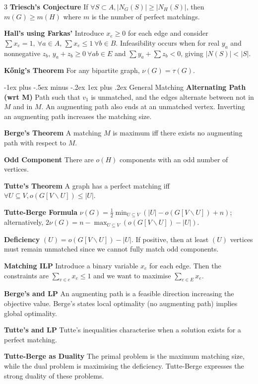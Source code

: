 \documentclass[10pt, landscape]{article}
\makeatletter
\renewcommand{\subsection}{\@startsection{subsection}{3}{0mm}%
                                {-1ex plus -.5ex minus -.2ex}%
                                {1ex plus .2ex}%
                                {\normalfont\small\bfseries}}%
\makeatother
\begin{document}
\begin{multicols*}{3}
\textbf{Triesch's Conjecture} If $\forall S\subset A,|N_G(S)| \geq |N_H(S)|$, then $m(G) \geq m(H)$ where $m$ is the number of perfect matchings.

\textbf{Hall's using Farkas'} Introduce $x_e \geq 0$ for each edge and consider $\sum x_e=1,\ \forall a \in A$, $\sum x_e \leq 1 \ \forall b \in B$. Infeasibility occurs when for real $y_a$ and nonnegative $z_b$, $y_a+z_b \geq 0\ \forall ab \in E$ and $\sum y_a + \sum z_b <0$, giving $|N(S)|<|S|$.

\textbf{Kőnig's Theorem} For any bipartite graph, $\nu(G)=\tau(G)$.

\subsection{General Matching}
\textbf{Alternating Path (wrt M)} Path such that $v_1$ is unmatched, and the edges alternate between not in $M$ and in $M$. An augmenting path also ends at an unmatched vertex. Inverting an augmenting path increases the matching size.

\textbf{Berge's Theorem} A matching $M$ is maximum iff there exists no augmenting path with respect to $M$.

\textbf{Odd Component} There are $o(H)$ components with an odd number of vertices.

\textbf{Tutte's Theorem} A graph has a perfect matching iff $\forall U \subseteq V, o(G[V\backslash U]) \leq |U|$.

\textbf{Tutte-Berge Formula} $\nu(G)=\frac{1}{2}\min_{U \subseteq V}(|U|-o(G[V \backslash U])+n)$; alternatively, $2\nu(G)=n-\max_{U \subseteq V}(o(G[V \backslash U])-|U|)$.

\textbf{Deficiency} $(U)=o(G[V \backslash U])-|U|$. If positive, then at least $(U)$ vertices must remain unmatched since we cannot fully match odd components.

\textbf{Matching ILP} Introduce a binary variable $x_e$ for each edge. Then the constraints are $\sum_{v \in e}x_e \leq 1$ and we want to maximise $\sum_{e \in E} x_e$.

\textbf{Berge's and LP} An augmenting path is a feasible direction increasing the objective value. Berge's states local optimality (no augmenting path) implies global optimality.

\textbf{Tutte's and LP} Tutte's inequalities characterise when a solution exists for a perfect matching.

\textbf{Tutte-Berge as Duality} The primal problem is the maximum matching size, while the dual problem is maximising the deficiency. Tutte-Berge expresses the strong duality of these problems.


\end{multicols*}
\end{document}
